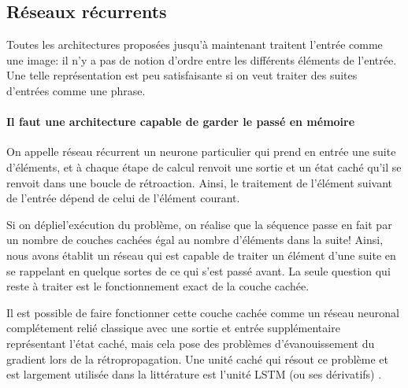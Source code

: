 \documentclass[a4paper, 11pt, onecolumn]{article}
\begin{document}
\subsection{Réseaux récurrents}

Toutes les architectures proposées jusqu'à maintenant traitent l'entrée comme
une \og image\fg: il n'y a pas de notion d'ordre entre les différents éléments
de l'entrée. Une telle représentation est peu satisfaisante si on veut traiter
des suites d'entrées comme une phrase.

\paragraph{Il faut une architecture capable de garder le passé en mémoire}

On appelle réseau récurrent un neurone particulier qui prend en entrée une suite
d'éléments, et à chaque étape de calcul renvoit une sortie et un état caché
qu'il se renvoit dans une boucle de rétroaction. Ainsi, le traitement de
l'élément suivant de l'entrée dépend de celui de l'élément courant.

Si on \og déplie\fg l'exécution du problème, on réalise que la séquence passe en
fait par un nombre de couches cachées égal au nombre d'éléments dans la suite!
Ainsi, nous avons établit un réseau qui est capable de traiter un élément d'une
suite en se rappelant en quelque sortes de ce qui s'est passé avant. La seule
question qui reste à traiter est le fonctionnement exact de la couche cachée.

Il est possible de faire fonctionner cette couche cachée comme un réseau neuronal
complétement relié classique avec une sortie et entrée supplémentaire
représentant l'état caché, mais cela pose des problèmes d'évanouissement du
gradient lors de la rétropropagation. Une unité caché qui résout ce problème et
est largement utilisée dans la littérature est l'unité LSTM (ou ses dérivatifs) \cite{hochreiter1997long}.
\end{document}
